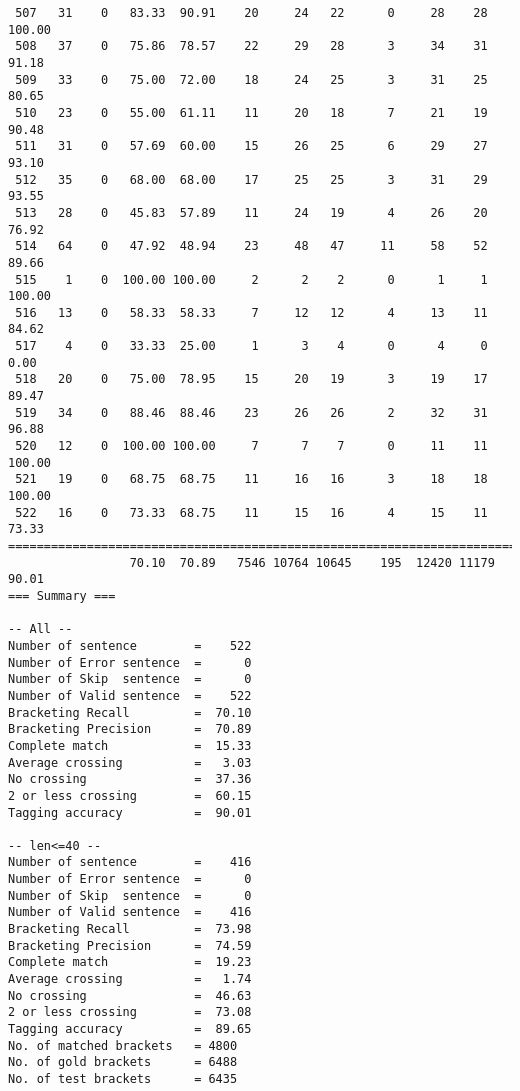 \begin{verbatim}
 507   31    0   83.33  90.91    20     24   22      0     28    28   100.00
 508   37    0   75.86  78.57    22     29   28      3     34    31    91.18
 509   33    0   75.00  72.00    18     24   25      3     31    25    80.65
 510   23    0   55.00  61.11    11     20   18      7     21    19    90.48
 511   31    0   57.69  60.00    15     26   25      6     29    27    93.10
 512   35    0   68.00  68.00    17     25   25      3     31    29    93.55
 513   28    0   45.83  57.89    11     24   19      4     26    20    76.92
 514   64    0   47.92  48.94    23     48   47     11     58    52    89.66
 515    1    0  100.00 100.00     2      2    2      0      1     1   100.00
 516   13    0   58.33  58.33     7     12   12      4     13    11    84.62
 517    4    0   33.33  25.00     1      3    4      0      4     0     0.00
 518   20    0   75.00  78.95    15     20   19      3     19    17    89.47
 519   34    0   88.46  88.46    23     26   26      2     32    31    96.88
 520   12    0  100.00 100.00     7      7    7      0     11    11   100.00
 521   19    0   68.75  68.75    11     16   16      3     18    18   100.00
 522   16    0   73.33  68.75    11     15   16      4     15    11    73.33
============================================================================
                 70.10  70.89   7546 10764 10645    195  12420 11179    90.01
=== Summary ===

-- All --
Number of sentence        =    522
Number of Error sentence  =      0
Number of Skip  sentence  =      0
Number of Valid sentence  =    522
Bracketing Recall         =  70.10
Bracketing Precision      =  70.89
Complete match            =  15.33
Average crossing          =   3.03
No crossing               =  37.36
2 or less crossing        =  60.15
Tagging accuracy          =  90.01

-- len<=40 --
Number of sentence        =    416
Number of Error sentence  =      0
Number of Skip  sentence  =      0
Number of Valid sentence  =    416
Bracketing Recall         =  73.98
Bracketing Precision      =  74.59
Complete match            =  19.23
Average crossing          =   1.74
No crossing               =  46.63
2 or less crossing        =  73.08
Tagging accuracy          =  89.65
No. of matched brackets   = 4800
No. of gold brackets      = 6488
No. of test brackets      = 6435

\end{verbatim}

\normalsize

